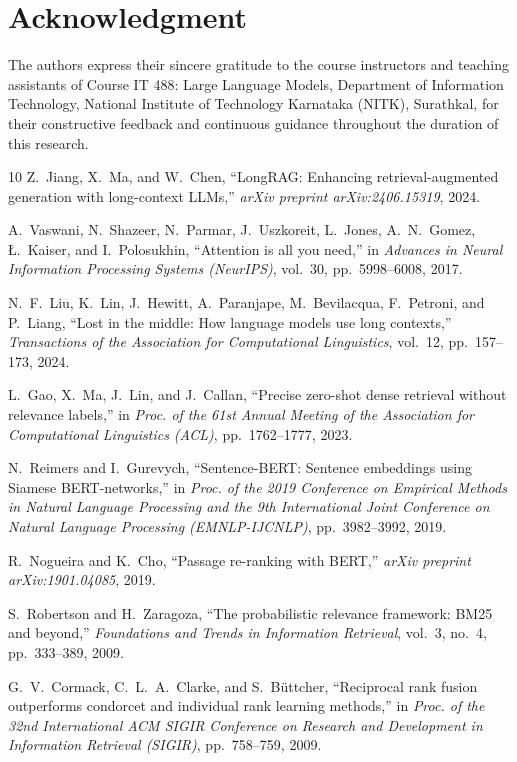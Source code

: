 \documentclass[lettersize,journal]{IEEEtran}
\begin{document}
\section*{Acknowledgment}
The authors express their sincere gratitude to the course instructors and teaching assistants of Course IT 488: Large Language Models, Department of Information Technology, National Institute of Technology Karnataka (NITK), Surathkal, for their constructive feedback and continuous guidance throughout the duration of this research.

\begin{thebibliography}{10}
Z.~Jiang, X.~Ma, and W.~Chen, ``LongRAG: Enhancing retrieval-augmented generation with long-context LLMs,'' \textit{arXiv preprint arXiv:2406.15319}, 2024.

A.~Vaswani, N.~Shazeer, N.~Parmar, J.~Uszkoreit, L.~Jones, A.~N.~Gomez, \L.~Kaiser, and I.~Polosukhin, ``Attention is all you need,'' in \textit{Advances in Neural Information Processing Systems (NeurIPS)}, vol.~30, pp.~5998--6008, 2017.

N.~F.~Liu, K.~Lin, J.~Hewitt, A.~Paranjape, M.~Bevilacqua, F.~Petroni, and P.~Liang, ``Lost in the middle: How language models use long contexts,'' \textit{Transactions of the Association for Computational Linguistics}, vol.~12, pp.~157--173, 2024.

L.~Gao, X.~Ma, J.~Lin, and J.~Callan, ``Precise zero-shot dense retrieval without relevance labels,'' in \textit{Proc. of the 61st Annual Meeting of the Association for Computational Linguistics (ACL)}, pp.~1762--1777, 2023.

N.~Reimers and I.~Gurevych, ``Sentence-BERT: Sentence embeddings using Siamese BERT-networks,'' in \textit{Proc. of the 2019 Conference on Empirical Methods in Natural Language Processing and the 9th International Joint Conference on Natural Language Processing (EMNLP-IJCNLP)}, pp.~3982--3992, 2019.

R.~Nogueira and K.~Cho, ``Passage re-ranking with BERT,'' \textit{arXiv preprint arXiv:1901.04085}, 2019.

S.~Robertson and H.~Zaragoza, ``The probabilistic relevance framework: BM25 and beyond,'' \textit{Foundations and Trends in Information Retrieval}, vol.~3, no.~4, pp.~333--389, 2009.

G.~V.~Cormack, C.~L.~A.~Clarke, and S.~B\"{u}ttcher, ``Reciprocal rank fusion outperforms condorcet and individual rank learning methods,'' in \textit{Proc. of the 32nd International ACM SIGIR Conference on Research and Development in Information Retrieval (SIGIR)}, pp.~758--759, 2009.


\end{thebibliography}
\end{document}
